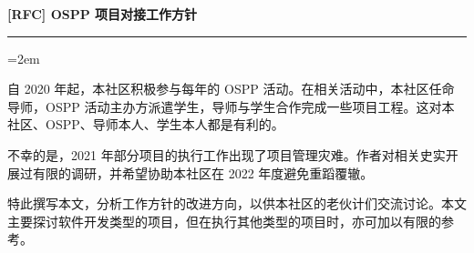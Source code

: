 \documentclass[a4paper,11pt]{article}
\begin{document}
\rmfamily







{\sffamily\huge\bfseries [RFC] OSPP 项目对接工作方针}
\vspace{12pt}

{\fontsize{10pt}{10pt}\selectfont\tableofcontents}

\vspace{2em}
\hrule
\vspace{1.5em}







\parindent=2em
\setdefaultleftmargin{2em}{1em}{1em}{1em}{1em}{1em}






自 2020 年起，本社区积极参与每年的 OSPP 活动。在相关活动中，本社区任命导师，OSPP 活动主办方派遣学生，导师与学生合作完成一些项目工程。这对本社区、OSPP、导师本人、学生本人都是有利的。

不幸的是，2021 年部分项目的执行工作出现了项目管理灾难。作者对相关史实开展过有限的调研，并希望协助本社区在 2022 年度避免重蹈覆辙。

特此撰写本文，分析工作方针的改进方向，以供本社区的老伙计们交流讨论。本文主要探讨软件开发类型的项目，但在执行其他类型的项目时，亦可加以有限的参考。
\end{document}
